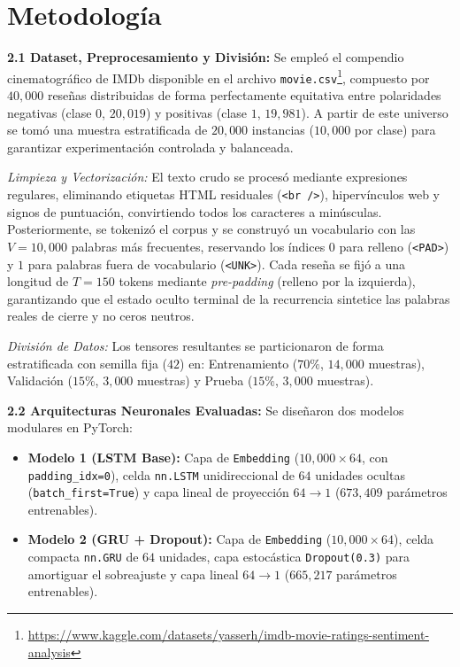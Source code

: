 \documentclass[letterpaper, 10 pt, conference]{ieeeconf}
\begin{document}
\section{Metodología}

\textbf{2.1 Dataset, Preprocesamiento y División:}
Se empleó el compendio cinematográfico de IMDb disponible en el archivo \texttt{movie.csv}\footnote{\url{https://www.kaggle.com/datasets/yasserh/imdb-movie-ratings-sentiment-analysis}}, compuesto por $40{,}000$ reseñas distribuidas de forma perfectamente equitativa entre polaridades negativas (clase $0$, $20{,}019$) y positivas (clase $1$, $19{,}981$). A partir de este universo se tomó una muestra estratificada de $20{,}000$ instancias ($10{,}000$ por clase) para garantizar experimentación controlada y balanceada.

\textit{Limpieza y Vectorización:} El texto crudo se procesó mediante expresiones regulares, eliminando etiquetas HTML residuales (\texttt{<br />}), hipervínculos web y signos de puntuación, convirtiendo todos los caracteres a minúsculas. Posteriormente, se tokenizó el corpus y se construyó un vocabulario con las $V = 10{,}000$ palabras más frecuentes, reservando los índices $0$ para relleno (\texttt{<PAD>}) y $1$ para palabras fuera de vocabulario (\texttt{<UNK>}). Cada reseña se fijó a una longitud de $T = 150$ tokens mediante \textit{pre-padding} (relleno por la izquierda), garantizando que el estado oculto terminal de la recurrencia sintetice las palabras reales de cierre y no ceros neutros.

\textit{División de Datos:} Los tensores resultantes se particionaron de forma estratificada con semilla fija ($42$) en: Entrenamiento ($70\%$, $14{,}000$ muestras), Validación ($15\%$, $3{,}000$ muestras) y Prueba ($15\%$, $3{,}000$ muestras).

\textbf{2.2 Arquitecturas Neuronales Evaluadas:}
Se diseñaron dos modelos modulares en PyTorch:
\begin{itemize}
    \item \textbf{Modelo 1 (LSTM Base):} Capa de \texttt{Embedding} ($10{,}000 \times 64$, con \texttt{padding\_idx=0}), celda \texttt{nn.LSTM} unidireccional de $64$ unidades ocultas (\texttt{batch\_first=True}) y capa lineal de proyección $64 \to 1$ ($673{,}409$ parámetros entrenables).
    \item \textbf{Modelo 2 (GRU + Dropout):} Capa de \texttt{Embedding} ($10{,}000 \times 64$), celda compacta \texttt{nn.GRU} de $64$ unidades, capa estocástica \texttt{Dropout(0.3)} para amortiguar el sobreajuste y capa lineal $64 \to 1$ ($665{,}217$ parámetros entrenables).
\end{itemize}
\end{document}
